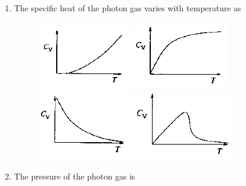 \documentclass[journal,12pt,onecolumn]{IEEEtran}
\theoremstyle{remark}
\begin{document}
\begin{enumerate}
\item The specific heat of the photon gas varies with temperature as\hfill{}
\begin{figure}[H]
	\centering
	\caption*{} \label{fig:50a} \includegraphics[width=0.35\columnwidth]{figs/50a.png}
	\caption*{} \label{fig:50b} \includegraphics[width=0.35\columnwidth]{figs/50b.png}
	\caption*{} \label{fig:50c} \includegraphics[width=0.35\columnwidth]{figs/50c.png}
	\caption*{} \label{fig:50d} \includegraphics[width=0.35\columnwidth]{figs/50d.png}
\end{figure}

\item The pressure of the photon gas is\hfill{}

\begin{enumerate}  \end{enumerate}


\end{enumerate}
\end{document}
